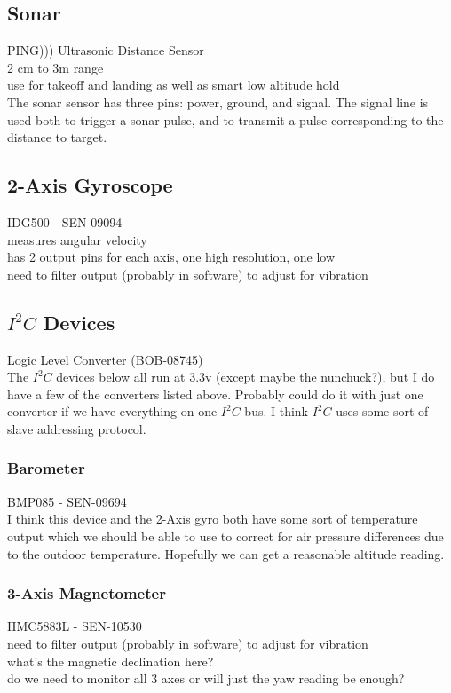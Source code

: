 \documentclass{article}
\begin{document}
\subsection{Sonar}
PING))) Ultrasonic Distance Sensor\\
2 cm to 3m range\\
use for takeoff and landing as well as smart low altitude hold\\

The sonar sensor has three pins: power, ground, and signal.  The signal line is used both to trigger a sonar pulse, and to transmit a pulse corresponding to the distance to target.

\subsection{2-Axis Gyroscope}
IDG500 - SEN-09094\\
measures angular velocity\\
has 2 output pins for each axis, one high resolution, one low\\
need to filter output (probably in software) to adjust for vibration\\

\subsection{$I^2C$ Devices}
Logic Level Converter (BOB-08745)\\
The $I^2C$ devices below all run at 3.3v (except maybe the nunchuck?), but I do have a few of the 
converters listed above.  Probably could do it with just one converter if we have everything on one $I^2C$ bus.  I think $I^2C$ uses some sort of slave addressing protocol.

\subsubsection{Barometer}
BMP085 - SEN-09694\\
I think this device and the 2-Axis gyro both have some sort of temperature output which we should be able to use to correct for air pressure differences due to the outdoor temperature.  Hopefully we can get a reasonable altitude reading.

\subsubsection{3-Axis Magnetometer}
HMC5883L - SEN-10530\\
need to filter output (probably in software) to adjust for vibration\\
what's the magnetic declination here?\\
do we need to monitor all 3 axes or will just the yaw reading be enough?\\
\end{document}
